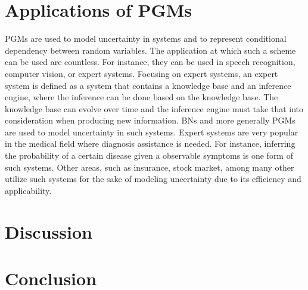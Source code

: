 \documentclass{article}
\begin{document}
\section{Applications of PGMs}
PGMs are used to model uncertainty in systems and to represent conditional dependency between random variables. The application at which such a scheme can be used are countless. For instance, they can be used in speech recognition, computer vision, or expert systems. Focusing on expert systems, an expert system is defined as a system that contains a knowledge base and an inference engine, where the inference can be done based on the knowledge base. The knowledge base can evolve over time and the inference engine must take that into consideration when producing new information. BNs and more generally PGMs are used to model uncertainty in such systems. Expert systems are very popular in the medical field where diagnosis assistance is needed. For instance, inferring the probability of a certain disease given a observable symptoms is one form of such systems. Other areas, such as insurance, stock market, among many other utilize such systems for the sake of modeling uncertainty due to its efficiency and applicability. 
\section*{Discussion}
\section*{Conclusion}
\nocite{cs229}
\nocite{mitchell1997machine}
\nocite{koller2009probabilistic}
\nocite{pernkopf2014introduction}
\nocite{bishop2006pattern}
\nocite{kimArticle}
\nocite{beretta2018learning}


\end{document}

